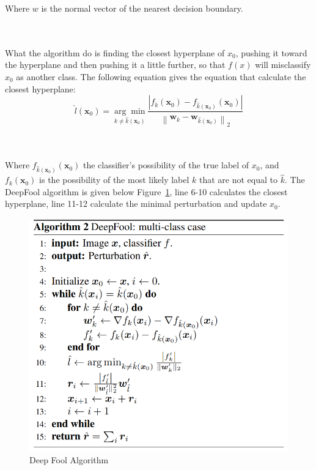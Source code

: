 \documentclass{article}
\begin{document}
\noindent Where $w$ is the normal vector of the nearest decision boundary.
 
 
\\ \hspace*{\fill} \\\noindent What the algorithm do is finding the closest hyperplane of $x_0$, pushing it toward the hyperplane and then pushing it a little further, so that $f(x)$ will misclassify $x_0$ as another class.
The following equation gives the equation that calculate the closest hyperplane:
\begin{equation*}
\hat{l}\left(\boldsymbol{x}_{0}\right)=\underset{k \neq \hat{k}\left(\boldsymbol{x}_{0}\right)}{\arg \min } \frac{\left|f_{k}\left(\boldsymbol{x}_{0}\right)-f_{\hat{k}\left(\boldsymbol{x}_{0}\right)}\left(\boldsymbol{x}_{0}\right)\right|}{\left\|\boldsymbol{w}_{k}-\boldsymbol{w}_{\hat{k}\left(\boldsymbol{x}_{0}\right)}\right\|_{2}}
\end{equation*}


\\ \hspace*{\fill} \\\noindent Where $f_{\hat{k}\left(\boldsymbol{x}_{0}\right)}\left(\boldsymbol{x}_{0}\right)$ the classifier’s possibility of the true label of $ x_{0}$, and $f_{k}\left(\boldsymbol{x}_{0}\right)$ is the possibility of the most likely label $k$ that are not equal to $\hat{k}$.
The DeepFool algorithm is given below Figure~\ref{fig:deep_fool_algo}, line 6-10 calculates the closest hyperplane, line 11-12 calculate the minimal perturbation and update $ x_{0}$.

\begin{figure}[h]
    \centering
    \includegraphics[width=1\linewidth]{deep_fool_algo.png}
    \caption{\small Deep Fool Algorithm}
    \label{fig:deep_fool_algo}
\end{figure}
\end{document}
